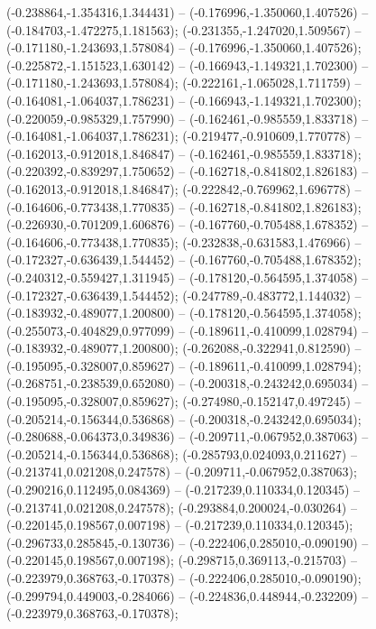  (-0.238864,-1.354316,1.344431) -- (-0.176996,-1.350060,1.407526) -- (-0.184703,-1.472275,1.181563);
 (-0.231355,-1.247020,1.509567) -- (-0.171180,-1.243693,1.578084) -- (-0.176996,-1.350060,1.407526);
 (-0.225872,-1.151523,1.630142) -- (-0.166943,-1.149321,1.702300) -- (-0.171180,-1.243693,1.578084);
 (-0.222161,-1.065028,1.711759) -- (-0.164081,-1.064037,1.786231) -- (-0.166943,-1.149321,1.702300);
 (-0.220059,-0.985329,1.757990) -- (-0.162461,-0.985559,1.833718) -- (-0.164081,-1.064037,1.786231);
 (-0.219477,-0.910609,1.770778) -- (-0.162013,-0.912018,1.846847) -- (-0.162461,-0.985559,1.833718);
 (-0.220392,-0.839297,1.750652) -- (-0.162718,-0.841802,1.826183) -- (-0.162013,-0.912018,1.846847);
 (-0.222842,-0.769962,1.696778) -- (-0.164606,-0.773438,1.770835) -- (-0.162718,-0.841802,1.826183);
 (-0.226930,-0.701209,1.606876) -- (-0.167760,-0.705488,1.678352) -- (-0.164606,-0.773438,1.770835);
 (-0.232838,-0.631583,1.476966) -- (-0.172327,-0.636439,1.544452) -- (-0.167760,-0.705488,1.678352);
 (-0.240312,-0.559427,1.311945) -- (-0.178120,-0.564595,1.374058) -- (-0.172327,-0.636439,1.544452);
 (-0.247789,-0.483772,1.144032) -- (-0.183932,-0.489077,1.200800) -- (-0.178120,-0.564595,1.374058);
 (-0.255073,-0.404829,0.977099) -- (-0.189611,-0.410099,1.028794) -- (-0.183932,-0.489077,1.200800);
 (-0.262088,-0.322941,0.812590) -- (-0.195095,-0.328007,0.859627) -- (-0.189611,-0.410099,1.028794);
 (-0.268751,-0.238539,0.652080) -- (-0.200318,-0.243242,0.695034) -- (-0.195095,-0.328007,0.859627);
 (-0.274980,-0.152147,0.497245) -- (-0.205214,-0.156344,0.536868) -- (-0.200318,-0.243242,0.695034);
 (-0.280688,-0.064373,0.349836) -- (-0.209711,-0.067952,0.387063) -- (-0.205214,-0.156344,0.536868);
 (-0.285793,0.024093,0.211627) -- (-0.213741,0.021208,0.247578) -- (-0.209711,-0.067952,0.387063);
 (-0.290216,0.112495,0.084369) -- (-0.217239,0.110334,0.120345) -- (-0.213741,0.021208,0.247578);
 (-0.293884,0.200024,-0.030264) -- (-0.220145,0.198567,0.007198) -- (-0.217239,0.110334,0.120345);
 (-0.296733,0.285845,-0.130736) -- (-0.222406,0.285010,-0.090190) -- (-0.220145,0.198567,0.007198);
 (-0.298715,0.369113,-0.215703) -- (-0.223979,0.368763,-0.170378) -- (-0.222406,0.285010,-0.090190);
 (-0.299794,0.449003,-0.284066) -- (-0.224836,0.448944,-0.232209) -- (-0.223979,0.368763,-0.170378);
